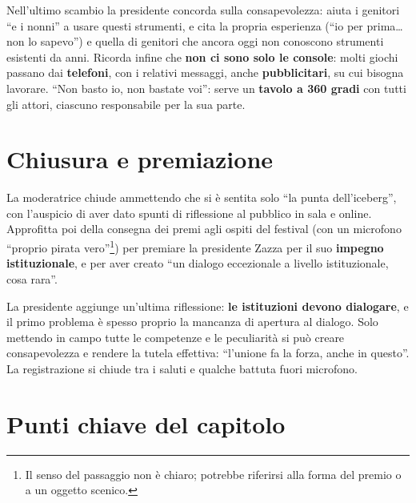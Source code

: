 Nell'ultimo scambio la presidente concorda sulla consapevolezza: aiuta i
genitori ``e i nonni'' a usare questi strumenti, e cita la propria esperienza
(``io per prima\dots non lo sapevo'') e quella di genitori che ancora oggi non
conoscono strumenti esistenti da anni. Ricorda infine che \textbf{non ci sono
solo le console}: molti giochi passano dai \textbf{telefoni}, con i relativi
messaggi, anche \textbf{pubblicitari}, su cui bisogna lavorare. ``Non basto io,
non bastate voi'': serve un \textbf{tavolo a 360 gradi} con tutti gli attori,
ciascuno responsabile per la sua parte.

\section{Chiusura e premiazione}
\label{sec:c1-1-chiusura}

La moderatrice chiude ammettendo che si è sentita solo ``la punta
dell'iceberg'', con l'auspicio di aver dato spunti di riflessione al pubblico in
sala e online. Approfitta poi della consegna dei premi agli ospiti del festival
(con un microfono ``proprio pirata vero''\footnote{Il senso del passaggio non è
chiaro; potrebbe riferirsi alla forma del premio o a un oggetto scenico.}) per
premiare la presidente Zazza per il suo \textbf{impegno istituzionale}, e per
aver creato ``un dialogo eccezionale a livello istituzionale, cosa rara''.

La presidente aggiunge un'ultima riflessione: \textbf{le istituzioni devono
dialogare}, e il primo problema è spesso proprio la mancanza di apertura al
dialogo. Solo mettendo in campo tutte le competenze e le peculiarità si può
creare consapevolezza e rendere la tutela effettiva: ``l'unione fa la forza,
anche in questo''. La registrazione si chiude tra i saluti e qualche battuta
fuori microfono.

\section*{Punti chiave del capitolo}

